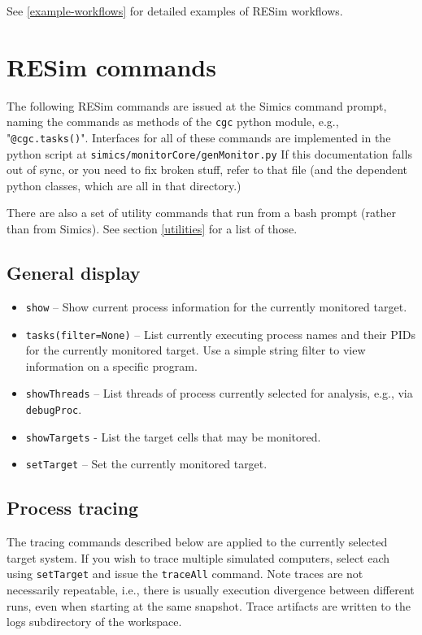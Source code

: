 \documentclass[titlepage]{article}
\begin{document}
See \ref{example-workflows} for detailed examples of RESim workflows.


\section{RESim commands}
\label{commands}
The following RESim commands are issued at the Simics command prompt, naming the commands as methods of the {\tt cgc} python module,
e.g., "{\tt @cgc.tasks()}".  Interfaces for all of these commands are implemented in the python script at {\tt simics/monitorCore/genMonitor.py}
If this documentation falls out of sync, or you need to fix broken stuff, refer to that file (and the dependent python classes, which are all in that directory.)

There are also a set of utility commands that run from a bash prompt (rather than from Simics).  See section \ref{utilities} for a list of those.

\subsection{General display}
\begin{itemize}
\item {\tt show} -- Show current process information for the currently monitored target.
\item {\tt tasks(filter=None)} -- List currently executing process names and their PIDs for the currently monitored target. Use a simple string filter to view information on
a specific program.
\item {\tt showThreads} -- List threads of process currently selected for analysis, e.g., via {\tt debugProc}.
\item {\tt showTargets} - List the target cells that may be monitored.
\item {\tt setTarget} -- Set the currently monitored target.
\end{itemize}

\subsection{Process tracing}
\label{process_tracing}
The tracing commands described below are applied to the currently selected target system.  If you wish to trace multiple simulated computers, select
each using {\tt setTarget} and issue the {\tt traceAll} command.  Note traces are not necessarily repeatable, i.e., there is usually execution 
divergence between different runs, even when starting at the same snapshot.  Trace artifacts are written to the logs subdirectory of the workspace.
\end{document}
